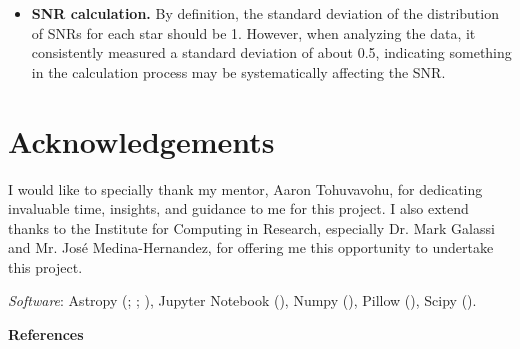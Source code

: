 \documentclass{article}
\begin{document}
\begin{multicols}{2}
\begin{itemize}
\item \textbf{SNR calculation.} By definition, the standard deviation of the distribution of SNRs for each star should be 1. However, when analyzing the data, it consistently measured a standard deviation of about 0.5, indicating something in the calculation process may be systematically affecting the SNR.

\end{itemize}

\section{Acknowledgements}
I would like to specially thank my mentor, Aaron Tohuvavohu, for dedicating invaluable time, insights, and guidance to me for this project. I also extend thanks to the Institute for Computing in Research, especially Dr. Mark Galassi and Mr. José Medina-Hernandez, for offering me this opportunity to undertake this project.

\textit{Software}: Astropy (\cite{astropy:2013}; \citeyear{astropy:2018}; \citeyear{astropy:2022}), Jupyter Notebook (\cite{jupyter}), Numpy (\cite{numpy}), Pillow (\cite{pillow}), Scipy (\cite{scipy}).

\end{multicols}

\begin{center}
    \Large
    \textbf{References}
\end{center}

\printbibliography[heading=none]
\end{document}
